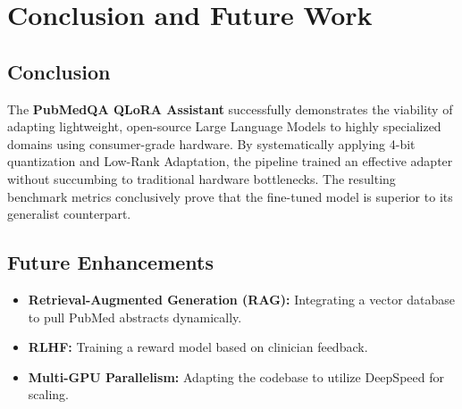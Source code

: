 \documentclass[12pt,a4paper]{report}
\begin{document}
\chapter{Conclusion and Future Work}

\section{Conclusion}
The \textbf{PubMedQA QLoRA Assistant} successfully demonstrates the viability of adapting lightweight, open-source Large Language Models to highly specialized domains using consumer-grade hardware. By systematically applying 4-bit quantization and Low-Rank Adaptation, the pipeline trained an effective adapter without succumbing to traditional hardware bottlenecks. The resulting benchmark metrics conclusively prove that the fine-tuned model is superior to its generalist counterpart.

\section{Future Enhancements}
\begin{itemize}
    \item \textbf{Retrieval-Augmented Generation (RAG):} Integrating a vector database to pull PubMed abstracts dynamically.
    \item \textbf{RLHF:} Training a reward model based on clinician feedback.
    \item \textbf{Multi-GPU Parallelism:} Adapting the codebase to utilize DeepSpeed for scaling.
\end{itemize}



\end{document}
